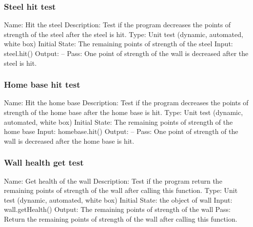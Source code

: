 \documentclass{article}
\begin{document}
\subsubsection{Steel hit test}
Name:  Hit the steel\newline
Description: Test if the program decreases the points of strength of the steel after the steel is hit. \newline
Type: Unit test (dynamic, automated, white box) \newline
Initial State:  The remaining points of strength of the steel\newline
Input: steel.hit()\newline
Output: --\newline
Pass:  One point of strength of the wall is decreased after the steel is hit. \newline

\subsubsection{Home base hit test}
Name:  Hit the home base\newline
Description: Test if the program decreases the points of strength of the home base after the home base is hit. \newline
Type: Unit test (dynamic, automated, white box) \newline
Initial State:  The remaining points of strength of the home base\newline
Input: homebase.hit()\newline
Output: --\newline
Pass:  One point of strength of the wall is decreased after the home base is hit. \newline

\subsubsection{Wall health get test}
Name:  Get health of the wall\newline
Description: Test if the program return the remaining points of strength of the wall after calling this function. \newline
Type: Unit test (dynamic, automated, white box) \newline
Initial State:  the object of wall\newline
Input: wall.getHealth()\newline
Output: The remaining points of strength of the wall\newline
Pass:  Return the remaining points of strength of the wall after calling this function. \newline
\end{document}
